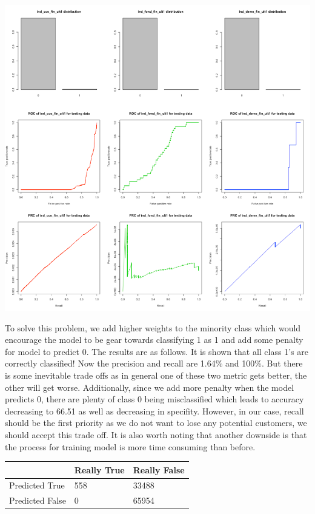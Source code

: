 \documentclass{article}
\begin{document}
\begin{spacing}{1}
\begin{large}
\vspace{5mm}
\includegraphics[scale = 0.5]{ROCandPR.png}
\vspace{5mm}

 To solve this problem, we add higher weights to the minority class which would encourage the model to be gear towards classifying 1 as 1 and add some penalty for model to predict 0. The results are as follows. It is shown that all class 1’s are correctly classified! Now the precision and recall are 1.64\% and 100\%. But there is some inevitable trade offs as in general one of these two metric gets better, the other will get worse. Additionally, since we add more penalty when the model predicts 0, there are plenty of class 0 being misclassified which leads to accuracy decreasing to 66.51 as well as decreasing in specifity. However, in our case, recall should be the first priority as we do not want to lose any potential customers, we should accept this trade off. It is also worth noting that another downside is that the process for training model is more time consuming than before.

\vspace{5mm}
\begin{tabular}{| l | l | l |}
	\hline
	& Really True & Really False \\ \hline
	Predicted True & 558 & 33488 \\ \hline
	Predicted False & 0 & 65954\\
	\hline
\end{tabular}
\vspace{5mm}


\end{large}
\end{spacing}
\end{document}
